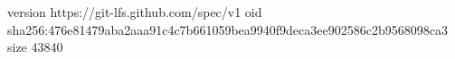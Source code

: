 version https://git-lfs.github.com/spec/v1
oid sha256:476e81479aba2aaa91c4c7b661059bea9940f9deca3ee902586c2b9568098ca3
size 43840
